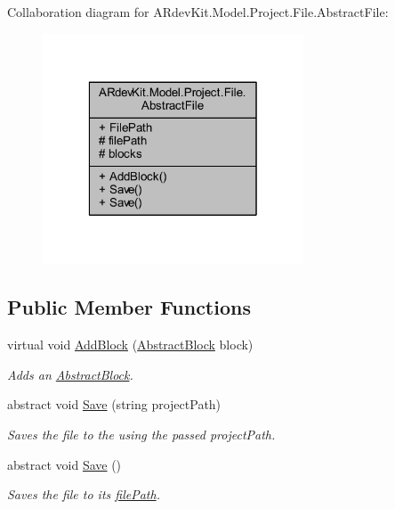 Collaboration diagram for A\-Rdev\-Kit.\-Model.\-Project.\-File.\-Abstract\-File\-:
\nopagebreak
\begin{figure}[H]
\begin{center}
\leavevmode
\includegraphics[width=220pt]{class_a_rdev_kit_1_1_model_1_1_project_1_1_file_1_1_abstract_file__coll__graph}
\end{center}
\end{figure}
\subsection*{Public Member Functions}
\begin{DoxyCompactItemize}
\item 
virtual void \hyperlink{class_a_rdev_kit_1_1_model_1_1_project_1_1_file_1_1_abstract_file_a02b61dbebfbd57f5fd44c7a972c79b50}{Add\-Block} (\hyperlink{class_a_rdev_kit_1_1_model_1_1_project_1_1_file_1_1_abstract_block}{Abstract\-Block} block)
\begin{DoxyCompactList}\small\item\em Adds an \hyperlink{class_a_rdev_kit_1_1_model_1_1_project_1_1_file_1_1_abstract_block}{Abstract\-Block}. \end{DoxyCompactList}\item 
abstract void \hyperlink{class_a_rdev_kit_1_1_model_1_1_project_1_1_file_1_1_abstract_file_ae49c3262c59642e8f519d0655bbbbbab}{Save} (string project\-Path)
\begin{DoxyCompactList}\small\item\em Saves the file to the using the passed project\-Path. \end{DoxyCompactList}\item 
abstract void \hyperlink{class_a_rdev_kit_1_1_model_1_1_project_1_1_file_1_1_abstract_file_a095ebaeca96a6d285d9caff1ad726d5b}{Save} ()
\begin{DoxyCompactList}\small\item\em Saves the file to its \hyperlink{class_a_rdev_kit_1_1_model_1_1_project_1_1_file_1_1_abstract_file_ad879e3a81860da8b72f2d9f61a18ab3b}{file\-Path}. \end{DoxyCompactList}\end{DoxyCompactItemize}
